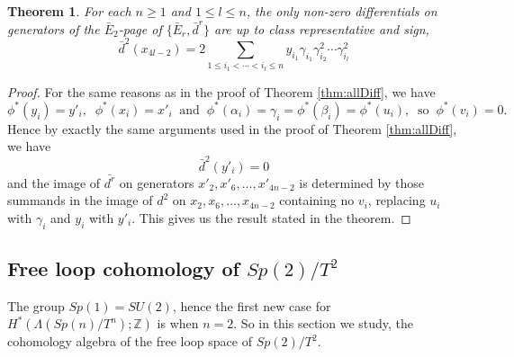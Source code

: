 \documentclass{article}
\theoremstyle{plain}
\newtheorem{thm}{Theorem}[section]
\theoremstyle{definition}
\numberwithin{thm}{section}
\begin{document}
		\begin{thm}\label{eq:SpDiff}
			For each $n\geq 1$ and $1\leq l \leq n$, the only non-zero differentials on generators of the $\bar{E}_2$-page of $\{ \bar{E}_r,\bar{d}^r \}$
			are up to class representative and sign,
			\begin{equation*}
				\bar{d}^2(x_{4l-2})=2\sum_{1\leq i_1<\cdots<i_l\leq n}{y_{i_1}\gamma_{i_1}\gamma_{i_2}^2\cdots\gamma_{i_l}^2}
			\end{equation*}
		
		\end{thm}
		
		\begin{proof}
			For the same reasons as in the proof of Theorem \ref{thm:allDiff}, we have
			\begin{equation*}
				\phi^*(y_i)=y'_i,\;\;\phi^*(x_i)=x'_i\;\;\text{and}\;\;\phi^*(\alpha_i)=\gamma_i=\phi^*(\beta_i)=\phi^*(u_i),\;\;\text{so}\;\;\phi^*(v_i)=0. 
			\end{equation*}
			Hence by exactly the same arguments used in the proof of Theorem \ref{thm:allDiff}, we have 
			\begin{equation*}
				\bar{d}^2(y'_i)=0
			\end{equation*}
			and the image of $\bar{d^r}$ on generators $x'_2,x'_6,\dots,x'_{4n-2}$
			is determined by those summands in the image of $d^2$ on $x_2,x_6,\dots,x_{4n-2}$ containing no $v_i$, replacing $u_i$ with $\gamma_i$ and $y_i$ with $y'_i$.
			This gives us the result stated in the theorem.
		\end{proof}
	
	\subsection{Free loop cohomology of $Sp(2)/T^2$}
		
		The group $Sp(1)=SU(2)$, hence the first new case for $H^*(\Lambda(Sp(n)/T^n);\mathbb{Z})$ is when $n=2$.
		So in this section we study, the cohomology algebra of the free loop space of $Sp(2)/T^2$.
		
\end{document}

